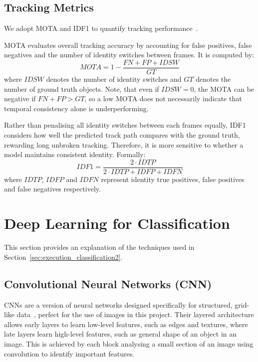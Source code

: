 \documentclass[author={Jacob Stephenson},
    degree={BSc},
    title={Robust Great Ape Species Detection in Wild Camera Trap Imagery with Promptable Concept Segmentation},
    unit={COMS30045},
    subtitle={}]{dissertation}
\begin{document}
\subsection{Tracking Metrics}

We adopt MOTA and IDF1 to quantify tracking performance~\cite{MOTmetrics}.

MOTA evaluates overall tracking accuracy by accounting for false positives, false negatives and the number of identity switches between frames. It is computed by:
\begin{equation}
    MOTA = 1 - \frac{FN + FP + IDSW}{GT}
\end{equation}
where $IDSW$ denotes the number of identity switches and $GT$ denotes the number of ground truth objects. Note, that even if $IDSW = 0$, the MOTA can be negative if $FN + FP > GT$, so a low MOTA does not necessarily indicate that temporal consistency alone is underperforming.

Rather than penalising all identity switches between each frames equally, IDF1 considers how well the predicted track path compares with the ground truth, rewarding long unbroken tracking. Therefore, it is more sensitive to whether a model maintains consistent identity. Formally:
\begin{equation}
    IDF1 = 
    \frac{2 \cdot IDTP}
    {2 \cdot IDTP + IDFP + IDFN}
\end{equation}
where $IDTP$, $IDFP$ and $IDFN$ represent identity true positives, false positives and false negatives respectively.



\section{Deep Learning for Classification}

This section provides an explanation of the techniques used in Section~\ref{sec:execution_classification2}.

\subsection{Convolutional Neural Networks (CNN)}

CNNs are a version of neural networks designed specifically for structured, grid-like data~\cite{Goodfellow-et-al-2016}, perfect for the use of images in this project. Their layered architecture allows early layers to learn low-level features, such as edges and textures, where late layers learn high-level features, such as general shape of an object in an image. This is achieved by each block analysing a small section of an image using convolution to identify important features.
\end{document}
